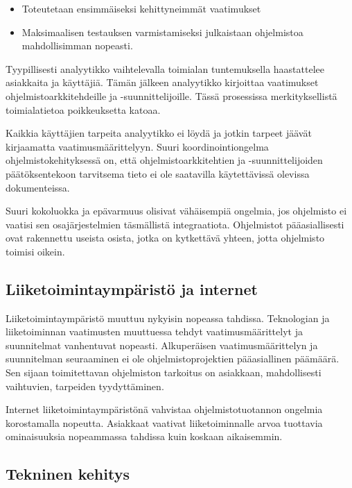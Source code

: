 \documentclass[finnish]{tktltiki2}
\theoremstyle{definition}
\theoremstyle{remark}
\begin{document}
\begin{itemize}
 \item Toteutetaan ensimmäiseksi kehittyneimmät vaatimukset
 \item Maksimaalisen testauksen varmistamiseksi julkaistaan ohjelmistoa mahdollisimman nopeasti\cite{MWR84}.
\end{itemize}

Tyypillisesti analyytikko vaihtelevalla toimialan tuntemuksella haastattelee asiakkaita ja käyttäjiä. Tämän jälkeen analyytikko kirjoittaa vaatimukset ohjelmistoarkkitehdeille ja -suunnittelijoille. Tässä prosessissa merkityksellistä toimialatietoa poikkeuksetta katoaa\cite{KES95}.

Kaikkia käyttäjien tarpeita analyytikko ei löydä ja jotkin tarpeet jäävät kirjaamatta vaatimusmäärittelyyn. Suuri koordinointiongelma ohjelmistokehityksessä on, että ohjelmistoarkkitehtien ja -suunnittelijoiden päätöksentekoon tarvitsema tieto ei ole saatavilla käytettävissä olevissa dokumenteissa\cite{KES95}.

Suuri kokoluokka ja epävarmuus olisivat vähäisempiä ongelmia, jos ohjelmisto ei vaatisi sen osajärjestelmien täsmällistä integraatiota. Ohjelmistot pääasiallisesti ovat rakennettu useista osista, jotka on kytkettävä yhteen, jotta ohjelmisto toimisi oikein\cite{KES95}.

\subsection{Liiketoimintaympäristö ja internet}

Liiketoimintaympäristö muuttuu nykyisin nopeassa tahdissa. Teknologian ja liiketoiminnan vaatimusten muuttuessa tehdyt vaatimusmäärittelyt ja suunnitelmat vanhentuvat nopeasti\cite{WIC03}. Alkuperäisen vaatimusmäärittelyn ja suunnitelman seuraaminen ei ole ohjelmistoprojektien pääasiallinen päämäärä. Sen sijaan toimitettavan ohjelmiston tarkoitus on asiakkaan, mahdollisesti vaihtuvien, tarpeiden tyydyttäminen\cite{HIC01}.

Internet liiketoimintaympäristönä vahvistaa ohjelmistotuotannon ongelmia korostamalla nopeutta. Asiakkaat vaativat liiketoiminnalle arvoa tuottavia ominaisuuksia nopeammassa tahdissa kuin koskaan aikaisemmin\cite{BRL03}.

\subsection{Tekninen kehitys}
\end{document}

